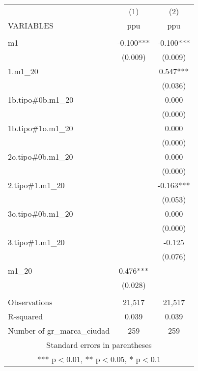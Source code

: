 \begin{tabular}{lcc} \hline
 & (1) & (2) \\
VARIABLES & ppu & ppu \\ \hline
 &  &  \\
m1 & -0.100*** & -0.100*** \\
 & (0.009) & (0.009) \\
1.m1\_20 &  & 0.547*** \\
 &  & (0.036) \\
1b.tipo\#0b.m1\_20 &  & 0.000 \\
 &  & (0.000) \\
1b.tipo\#1o.m1\_20 &  & 0.000 \\
 &  & (0.000) \\
2o.tipo\#0b.m1\_20 &  & 0.000 \\
 &  & (0.000) \\
2.tipo\#1.m1\_20 &  & -0.163*** \\
 &  & (0.053) \\
3o.tipo\#0b.m1\_20 &  & 0.000 \\
 &  & (0.000) \\
3.tipo\#1.m1\_20 &  & -0.125 \\
 &  & (0.076) \\
m1\_20 & 0.476*** &  \\
 & (0.028) &  \\
 &  &  \\
Observations & 21,517 & 21,517 \\
R-squared & 0.039 & 0.039 \\
 Number of gr\_marca\_ciudad & 259 & 259 \\ \hline
\multicolumn{3}{c}{ Standard errors in parentheses} \\
\multicolumn{3}{c}{ *** p$<$0.01, ** p$<$0.05, * p$<$0.1} \\
\end{tabular}

